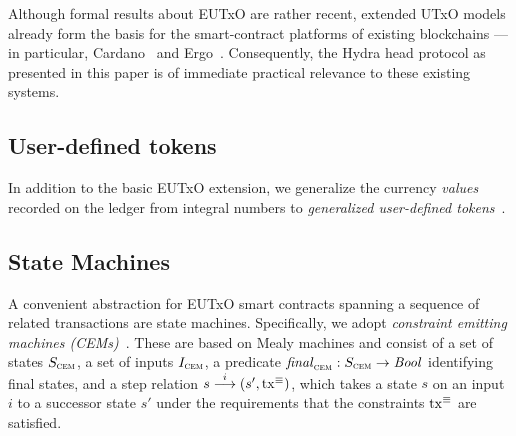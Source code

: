 Although formal results about EUTxO are rather recent, extended UTxO models already form the basis for the smart-contract platforms of existing blockchains --- in particular, Cardano~\cite{plutus-platform} and Ergo~\cite{ergo-platform}. Consequently, the Hydra head protocol as presented in this paper is of immediate practical relevance to these existing systems.

\subsection{User-defined tokens}

In addition to the basic EUTxO extension, we generalize the currency \emph{values} recorded on the ledger from integral numbers to \emph{generalized user-defined tokens}~\cite{eutxo-2}.



\subsection{State Machines}
A convenient abstraction for EUTxO smart contracts spanning a sequence
of related transactions are state machines. Specifically, we adopt
\emph{constraint emitting machines (CEMs)}~\cite{eutxo}. These are
based on Mealy machines and consist of a set of states $S_{\textsc{cem}}$, a set
of inputs $I_{\textsc{cem}}$, a predicate \(\mathit{final}_{\textsc{cem}} : S_{\textsc{cem}}\to\mathit{Bool}\)
identifying final states, and a step relation
\({s}\overset{i}\longrightarrow(s', \mathrm{tx}^\equiv)\), which takes a state $s$ on an
input $i$ to a successor state $s'$ under the requirements that the
constraints $\mathrm{tx}^\equiv$ are satisfied.

